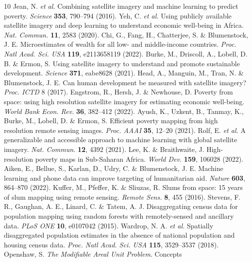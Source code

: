 \documentclass[11pt]{article}
\begin{document}
\begin{thebibliography}{10}
 Jean, N. \emph{et al.} Combining satellite imagery and machine
learning to predict poverty. \emph{Science} \textbf{353}, 790--794 (2016).
 Yeh, C. \emph{et al.} Using publicly available satellite imagery and
deep learning to understand economic well-being in Africa. \emph{Nat. Commun.}
\textbf{11}, 2583 (2020).
 Chi, G., Fang, H., Chatterjee, S. \& Blumenstock, J. E. Microestimates
of wealth for all low- and middle-income countries. \emph{Proc. Natl Acad. Sci. USA}
\textbf{119}, e2113658119 (2022).
 Burke, M., Driscoll, A., Lobell, D. B. \& Ermon, S. Using satellite
imagery to understand and promote sustainable development. \emph{Science} \textbf{371},
eabe8628 (2021).
 Head, A., Manguin, M., Tran, N. \& Blumenstock, J. E. Can human
development be measured with satellite imagery? \emph{Proc. ICTD} 8 (2017).
 Engstrom, R., Hersh, J. \& Newhouse, D. Poverty from space: using
high resolution satellite imagery for estimating economic well-being. \emph{World Bank
Econ. Rev.} \textbf{36}, 382--412 (2022).
 Ayush, K., Uzkent, B., Tanmay, K., Burke, M., Lobell, D. \& Ermon, S.
Efficient poverty mapping from high resolution remote sensing images. \emph{Proc. AAAI}
\textbf{35}, 12--20 (2021).
 Rolf, E. \emph{et al.} A generalizable and accessible approach to
machine learning with global satellite imagery. \emph{Nat. Commun.} \textbf{12}, 4392
(2021).
 Lee, K. \& Braithwaite, J. High-resolution poverty maps in Sub-Saharan
Africa. \emph{World Dev.} \textbf{159}, 106028 (2022).
 Aiken, E., Bellue, S., Karlan, D., Udry, C. \& Blumenstock, J. E.
Machine learning and phone data can improve targeting of humanitarian aid.
\emph{Nature} \textbf{603}, 864--870 (2022).
 Kuffer, M., Pfeffer, K. \& Sliuzas, R. Slums from space: 15 years
of slum mapping using remote sensing. \emph{Remote Sens.} \textbf{8}, 455 (2016).
 Stevens, F. R., Gaughan, A. E., Linard, C. \& Tatem, A. J.
Disaggregating census data for population mapping using random forests with
remotely-sensed and ancillary data. \emph{PLoS ONE} \textbf{10}, e0107042 (2015).
 Wardrop, N. A. \emph{et al.} Spatially disaggregated population
estimates in the absence of national population and housing census data. \emph{Proc.
Natl Acad. Sci. USA} \textbf{115}, 3529--3537 (2018).
 Openshaw, S. \emph{The Modifiable Areal Unit Problem}. Concepts

\end{thebibliography}
\end{document}
